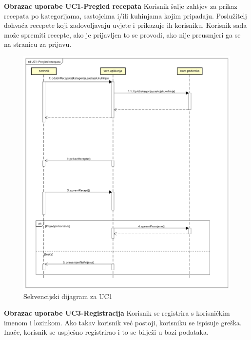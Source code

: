 \noindent
\textbf{Obrazac uporabe UC1-Pregled recepata}\newline
{Korisnik šalje zahtjev za prikaz recepata po kategorijama, sastojcima i/ili kuhinjama kojim pripadaju. Poslužitelj dohvaća recepete koji zadovoljavaju uvjete i prikazuje ih korisniku. Korisnik sada može spremiti recepte, ako je prijavljen to se provodi, ako nije preusmjeri ga se na stranicu za prijavu.}


\begin{figure}[H]
	\includegraphics[scale= 0.4]{slike/sekvencijski_dijagramUC1.png}
	\centering
	\caption{Sekvencijski dijagram za UC1}
	\label{fig:Sekvencijski dijagram za UC1}
\end{figure}
\eject

\noindent
\textbf{Obrazac uporabe UC3-Registracija}\newline
{Korisnik se registrira s korisničkim imenom i lozinkom. Ako takav korisnik već postoji, korisniku se ispisuje greška. Inače, korisnik se uspješno registrirao i to se bilježi u bazi podataka.}


